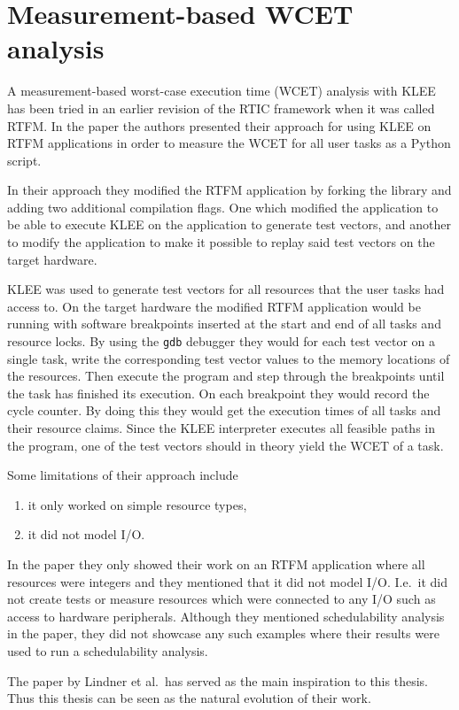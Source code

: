 \section{Measurement-based WCET analysis}
A measurement-based worst-case execution time (WCET) analysis with KLEE has
been tried in an earlier revision of the RTIC framework\cite{lindner} when it
was called RTFM. In the paper the authors presented their approach for using
KLEE on RTFM applications in order to measure the WCET for all user tasks as a
Python script.

In their approach they modified the RTFM application by forking the library and
adding two additional compilation flags. One which modified the application to be
able to execute KLEE on the application to generate test vectors, and another
to modify the application to make it possible to replay said test vectors on
the target hardware.

KLEE was used to generate test vectors for all resources that the user tasks
had access to. On the target hardware the modified RTFM application would be
running with software breakpoints inserted at the start and end of all tasks
and resource locks. By using the \texttt{gdb} debugger they would for each test
vector on a single task, write the corresponding test vector values to the
memory locations of the resources. Then execute the program and step through the
breakpoints until the task has finished its execution. On each breakpoint
they would record the cycle counter. By doing this they would get the execution
times of all tasks and their resource claims. Since the KLEE interpreter
executes all feasible paths in the program, one of the test vectors should
in theory yield the WCET of a task.

Some limitations of their approach include
\begin{enumerate}
    \item it only worked on simple resource types,
    \item it did not model I/O.
\end{enumerate}
In the paper they only showed their work on an RTFM application where all
resources were integers and they mentioned that it did not model I/O. I.e.\
it did not create tests or measure resources which were connected to any I/O
such as access to hardware peripherals. Although they mentioned schedulability
analysis in the paper, they did not showcase any such examples where their
results were used to run a schedulability analysis.

The paper by Lindner et al.\ has served as the main inspiration to this thesis.
Thus this thesis can be seen as the natural evolution of their work.

